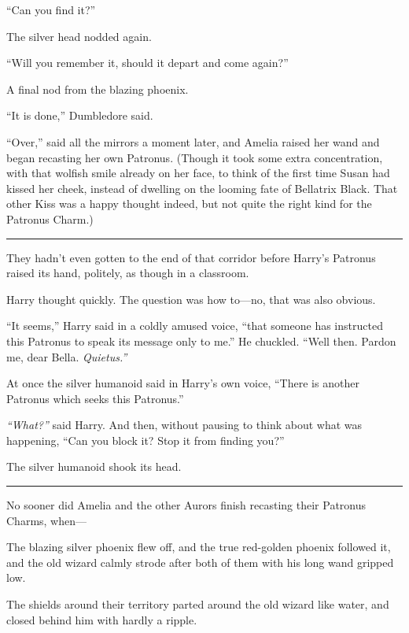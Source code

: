 ``Can you find it?''

The silver head nodded again.

``Will you remember it, should it depart and come again?''

A final nod from the blazing phoenix.

``It is done,'' Dumbledore said.

``Over,'' said all the mirrors a moment later, and Amelia raised her
wand and began recasting her own Patronus. (Though it took some extra
concentration, with that wolfish smile already on her face, to think of
the first time Susan had kissed her cheek, instead of dwelling on the
looming fate of Bellatrix Black. That other Kiss was a happy thought
indeed, but not quite the right kind for the Patronus Charm.)

\begin{center}\rule{3in}{0.4pt}\end{center}

They hadn't even gotten to the end of that corridor before Harry's
Patronus raised its hand, politely, as though in a classroom.

Harry thought quickly. The question was how to---no, that was also
obvious.

``It seems,'' Harry said in a coldly amused voice, ``that someone has
instructed this Patronus to speak its message only to me.'' He chuckled.
``Well then. Pardon me, dear Bella. \emph{Quietus.''}

At once the silver humanoid said in Harry's own voice, ``There is
another Patronus which seeks this Patronus.''

\emph{``What?''} said Harry. And then, without pausing to think about
what was happening, ``Can you block it? Stop it from finding you?''

The silver humanoid shook its head.

\begin{center}\rule{3in}{0.4pt}\end{center}

No sooner did Amelia and the other Aurors finish recasting their
Patronus Charms, when---

The blazing silver phoenix flew off, and the true red-golden phoenix
followed it, and the old wizard calmly strode after both of them with
his long wand gripped low.

The shields around their territory parted around the old wizard like
water, and closed behind him with hardly a ripple.

